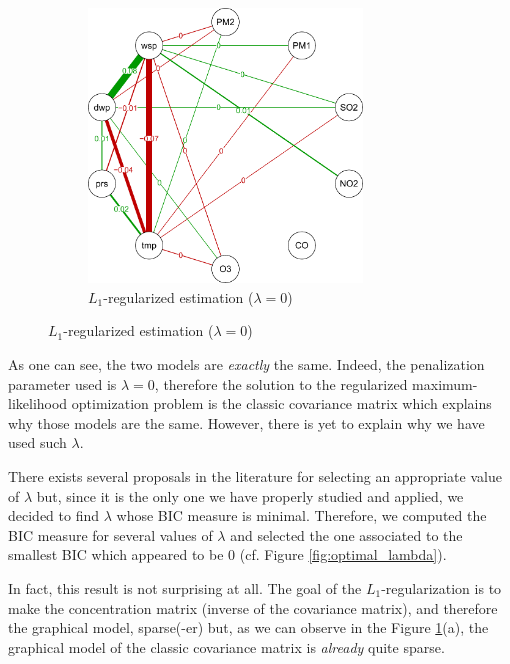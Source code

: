\documentclass[a4paper, 12pt]{article}
\begin{document}
\begin{figure}[h]
\begin{subfigure}{0.49\textwidth}
            \includegraphics[width=0.8\textwidth]{resources/pdf/qgraph_l1_cov.pdf}
            \caption{$L_1$-regularized estimation ($\lambda = 0$)}
        \end{subfigure}
        \label{fig:qgraphs}
    \end{figure}
    
    As one can see, the two models are \emph{exactly} the same. Indeed, the penalization parameter used is $\lambda = 0$, therefore the solution to the regularized maximum-likelihood optimization problem is the classic covariance matrix which explains why those models are the same. However, there is yet to explain why we have used such $\lambda$.
    
    There exists several proposals in the literature for selecting an appropriate value of $\lambda$ but, since it is the only one we have properly studied and applied, we decided to find $\lambda$ whose BIC measure is minimal. Therefore, we computed the BIC measure for several values of $\lambda$ and selected the one associated to the smallest BIC which appeared to be $0$ (cf. Figure \ref{fig:optimal_lambda}).
    
    In fact, this result is not surprising at all. The goal of the $L_1$-regularization is to make the concentration matrix (inverse of the covariance matrix), and therefore the graphical model, sparse(-er) but, as we can observe in the Figure \ref{fig:qgraphs}(a), the graphical model of the classic covariance matrix is \emph{already} quite sparse.
    
\end{document}
